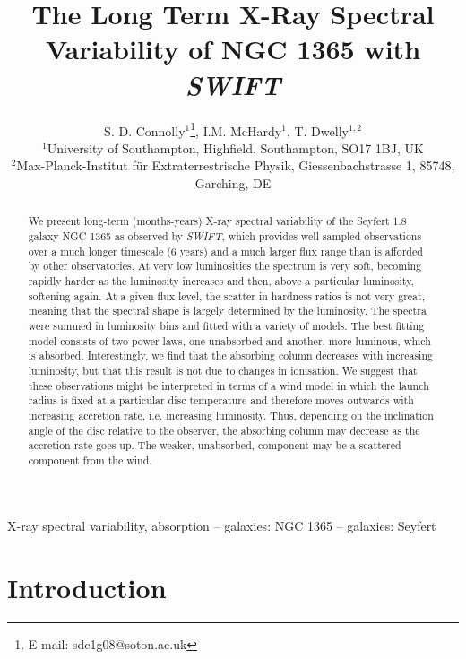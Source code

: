 \documentclass[useAMS,usenatbib]{sam}
\title[The Long Term X-Ray Spectral Variability of NGC 1365 with {\it SWIFT}]{The Long Term X-Ray Spectral Variability of NGC 1365 with {\it SWIFT}}
\author[S. D. Connolly, I.M. McHardy and T. Dwelly]{S. D. Connolly$^{1}$\thanks{E-mail: sdc1g08@soton.ac.uk}, I.M. McHardy$^{1}$, T. Dwelly$^{1,2}$ \\
$^{1}$University of Southampton, Highfield, Southampton, SO17 1BJ, UK\\
$^{2}$Max-Planck-Institut f\"{u}r Extraterrestrische Physik, Giessenbachstrasse 1, 85748, Garching, DE}
\begin{document}
\pagerange{\pageref{firstpage}--\pageref{lastpage}} 

\maketitle

\label{firstpage}

\begin{abstract}

We present long-term (months-years) X-ray spectral variability of the
Seyfert 1.8 galaxy NGC 1365 as observed by {\it SWIFT}, which provides
well sampled observations over a much longer timescale (6 years) and a
much larger flux range than is afforded by other observatories. At
very low luminosities the spectrum is very soft, becoming rapidly
harder as the luminosity increases and then, above a particular
luminosity, softening again.  At a given flux level, the scatter
in hardness ratios is not very great, meaning that the spectral shape is
largely determined by the luminosity.  The spectra were summed in
luminosity bins and fitted with a variety of models. The best fitting model
consists of two power laws, one unabsorbed and another, more luminous,
which is absorbed. Interestingly, we find that the absorbing column
decreases with increasing luminosity, but that this result is not due
to changes in ionisation. We suggest that these observations might be
interpreted in terms of a wind model in which the launch radius is
fixed at a particular disc temperature and therefore moves outwards with
increasing accretion rate, i.e. increasing luminosity. Thus, depending
on the inclination angle of the disc relative to the observer, the absorbing column may decrease
as the accretion rate goes up. The weaker, unabsorbed, component may
be a scattered component from the wind. 

\end{abstract}

\begin{keywords}
X-ray spectral variability, absorption – galaxies: NGC 1365 – galaxies: Seyfert
\end{keywords}

\section{Introduction}
\end{document}
